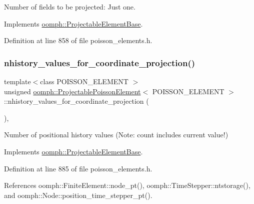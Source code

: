 Number of fields to be projected\+: Just one. 



Implements \hyperlink{classoomph_1_1ProjectableElementBase_a44634aa4049332a580d249c25564638c}{oomph\+::\+Projectable\+Element\+Base}.



Definition at line 858 of file poisson\+\_\+elements.\+h.

\mbox{\label{classoomph_1_1ProjectablePoissonElement_a42e8ec2cd54a3301190d2b3a10e66370}} 
\subsubsection{\texorpdfstring{nhistory\+\_\+values\+\_\+for\+\_\+coordinate\+\_\+projection()}{nhistory\_values\_for\_coordinate\_projection()}}
{\footnotesize\ttfamily template$<$class P\+O\+I\+S\+S\+O\+N\+\_\+\+E\+L\+E\+M\+E\+NT $>$ \\
unsigned \hyperlink{classoomph_1_1ProjectablePoissonElement}{oomph\+::\+Projectable\+Poisson\+Element}$<$ P\+O\+I\+S\+S\+O\+N\+\_\+\+E\+L\+E\+M\+E\+NT $>$\+::nhistory\+\_\+values\+\_\+for\+\_\+coordinate\+\_\+projection (\begin{DoxyParamCaption}{ }\end{DoxyParamCaption})\hspace{0.3cm}{\ttfamily [inline]}, {\ttfamily [virtual]}}



Number of positional history values (Note\+: count includes current value!) 



Implements \hyperlink{classoomph_1_1ProjectableElementBase_ab4ecd0cd24000a3ed675dc7198203c1f}{oomph\+::\+Projectable\+Element\+Base}.



Definition at line 885 of file poisson\+\_\+elements.\+h.



References oomph\+::\+Finite\+Element\+::node\+\_\+pt(), oomph\+::\+Time\+Stepper\+::ntstorage(), and oomph\+::\+Node\+::position\+\_\+time\+\_\+stepper\+\_\+pt().

